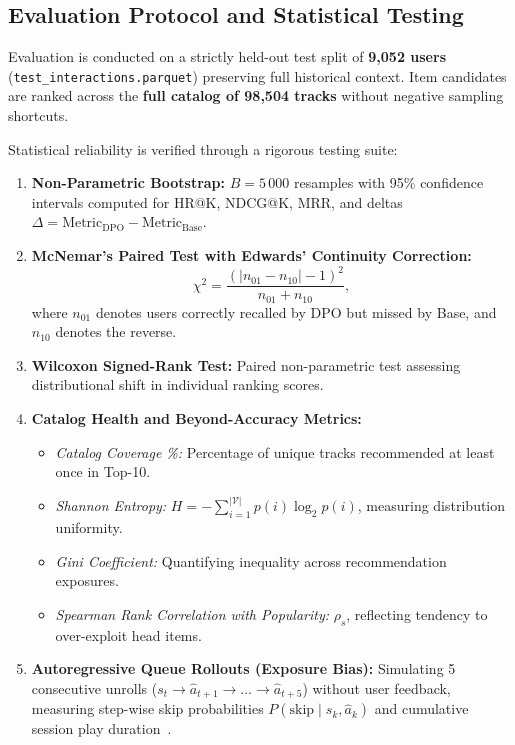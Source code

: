 \subsection{Evaluation Protocol and Statistical Testing}
Evaluation is conducted on a strictly held-out test split of \textbf{9,052 users} (\texttt{test\_interactions.parquet}) preserving full historical context. Item candidates are ranked across the \textbf{full catalog of 98,504 tracks} without negative sampling shortcuts.

Statistical reliability is verified through a rigorous testing suite:
\begin{enumerate}
    \item \textbf{Non-Parametric Bootstrap:} $B = 5\,000$ resamples with 95\% confidence intervals computed for HR@K, NDCG@K, MRR, and deltas $\Delta = \text{Metric}_{\text{DPO}} - \text{Metric}_{\text{Base}}$.
    \item \textbf{McNemar's Paired Test with Edwards' Continuity Correction:}
    \begin{equation}
        \chi^2 = \frac{(|n_{01} - n_{10}| - 1)^2}{n_{01} + n_{10}},
        \label{eq:mcnemar}
    \end{equation}
    where $n_{01}$ denotes users correctly recalled by DPO but missed by Base, and $n_{10}$ denotes the reverse.
    \item \textbf{Wilcoxon Signed-Rank Test:} Paired non-parametric test assessing distributional shift in individual ranking scores.
    \item \textbf{Catalog Health and Beyond-Accuracy Metrics:}
    \begin{itemize}
        \item \textit{Catalog Coverage \%:} Percentage of unique tracks recommended at least once in Top-10.
        \item \textit{Shannon Entropy:} $H = - \sum_{i=1}^{|\mathcal{V}|} p(i) \log_2 p(i)$, measuring distribution uniformity.
        \item \textit{Gini Coefficient:} Quantifying inequality across recommendation exposures.
        \item \textit{Spearman Rank Correlation with Popularity:} $\rho_s$, reflecting tendency to over-exploit head items.
    \end{itemize}
    \item \textbf{Autoregressive Queue Rollouts (Exposure Bias):} Simulating 5 consecutive unrolls ($s_t \to \hat{a}_{t+1} \to \dots \to \hat{a}_{t+5}$) without user feedback, measuring step-wise skip probabilities $P(\text{skip} \mid s_k, \hat{a}_k)$ and cumulative session play duration~\cite{matveev2026session}.
\end{enumerate}
